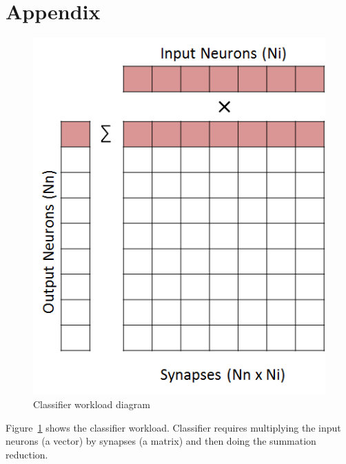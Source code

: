 \section{Appendix} \label{sec:appendix}

\begin{figure}
  \begin{center}
    \includegraphics[width=\linewidth]{cs758-figs/classifier-diagram.png}
  \end{center}
\vspace{-0.2in}
  \caption{Classifier workload diagram}
  \label{fig:classifier-diagram}
\vspace{-0.05in}
\end{figure}

Figure~\ref{fig:classifier-diagram} shows the classifier workload. 
Classifier requires multiplying the input neurons (a vector) by synapses 
(a matrix) and then doing the summation reduction.


